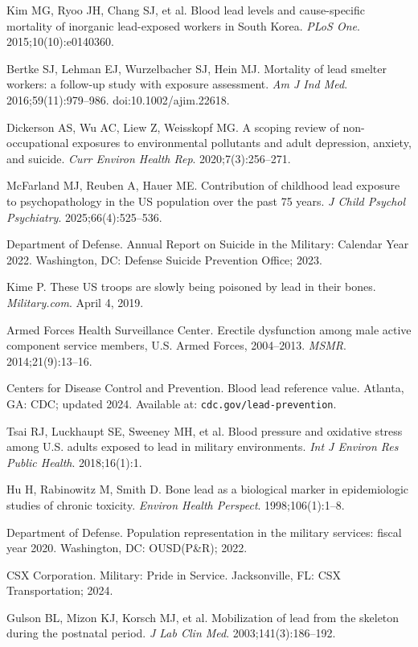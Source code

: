 \documentclass[11pt,twocolumn]{article}
\begin{document}
{\begin{enumerate}[label={[\arabic*]}, leftmargin=*, itemsep=1pt]
    \item Kim MG, Ryoo JH, Chang SJ, et al. Blood lead levels and cause-specific mortality of inorganic lead-exposed workers in South Korea. \textit{PLoS One}. 2015;10(10):e0140360.
    \item Bertke SJ, Lehman EJ, Wurzelbacher SJ, Hein MJ. Mortality of lead smelter workers: a follow-up study with exposure assessment. \textit{Am J Ind Med}. 2016;59(11):979--986. doi:10.1002/ajim.22618.
    \item Dickerson AS, Wu AC, Liew Z, Weisskopf MG. A scoping review of non-occupational exposures to environmental pollutants and adult depression, anxiety, and suicide. \textit{Curr Environ Health Rep}. 2020;7(3):256--271.
    \item McFarland MJ, Reuben A, Hauer ME. Contribution of childhood lead exposure to psychopathology in the US population over the past 75 years. \textit{J Child Psychol Psychiatry}. 2025;66(4):525--536.
    \item Department of Defense. Annual Report on Suicide in the Military: Calendar Year 2022. Washington, DC: Defense Suicide Prevention Office; 2023.
    \item Kime P. These US troops are slowly being poisoned by lead in their bones. \textit{Military.com}. April 4, 2019.
    \item Armed Forces Health Surveillance Center. Erectile dysfunction among male active component service members, U.S. Armed Forces, 2004--2013. \textit{MSMR}. 2014;21(9):13--16.
    \item Centers for Disease Control and Prevention. Blood lead reference value. Atlanta, GA: CDC; updated 2024. Available at: \texttt{cdc.gov/lead-prevention}.
    \item Tsai RJ, Luckhaupt SE, Sweeney MH, et al. Blood pressure and oxidative stress among U.S. adults exposed to lead in military environments. \textit{Int J Environ Res Public Health}. 2018;16(1):1.
    \item Hu H, Rabinowitz M, Smith D. Bone lead as a biological marker in epidemiologic studies of chronic toxicity. \textit{Environ Health Perspect}. 1998;106(1):1--8.
    \item Department of Defense. Population representation in the military services: fiscal year 2020. Washington, DC: OUSD(P\&R); 2022.
    \item CSX Corporation. Military: Pride in Service. Jacksonville, FL: CSX Transportation; 2024.
    \item Gulson BL, Mizon KJ, Korsch MJ, et al. Mobilization of lead from the skeleton during the postnatal period. \textit{J Lab Clin Med}. 2003;141(3):186--192.

\end{enumerate}}
\end{document}
